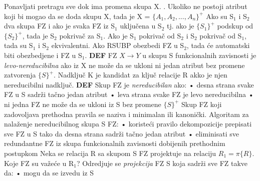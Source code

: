 \documentclass{article}
\begin{document}
Ponavljati pretragu sve dok ima promena skupa X. . Ukoliko ne postoji atribut koji bi mogao da se doda skupu X, tada
je X = $\{A_1,A_2,...,A_n\}^+$ 
\newpage
Ako su S$_1$ i S$_2$ dva skupa FZ i ako je svaka FZ iz S$_1$
uključena u S$_2$ tj. ako je $\{S_1\}^+$ podskup od $\{S_2\}^+$, tada
je S$_2$ pokrivač za S$_1$. Ako je S$_1$ pokrivač od S$_2$ i S$_2$
pokrivač od S$_1$, tada su S$_1$ i S$_2$ ekvivalentni. Ako RSUBP
obezbedi FZ u S$_2$, tada će automatski biti obezbedjene i FZ u
S$_1$.
\vspace{0.2cm} \newline
\textbf{DEF} FZ $X \rightarrow Y$ u skupu S funkcionalnih zavisnosti
je \textit{levo-nereducibilna} ako iz X ne može da se ukloni ni jedan
atribut bez promene zatvorenja $\{S\}^+$. \newline
Nadključ K je kandidat za ključ relacije R akko je njen nereducibilni
nadključ. \newline
\textbf{DEF} Skup FZ je \textit{nereducibilan} ako:
\newline \hspace*{0.4cm}• desna strana svake FZ u S sadrži tačno
jedan atribut
\newline \hspace*{0.4cm}• leva strana svake FZ je levo nereducibilna
\newline \hspace*{0.4cm}• ni jedna FZ ne može da se ukloni iz S bez
promene $\{S\}^+$
\newline Skup FZ koji zadovoljava prethodna pravila se naziva i
minimalan ili kanonički.
\vspace{0.2cm} \newline Algoritam za nalaženje nereducibilnog skupa S
FZ:
\newline \hspace*{0.4cm}• koristeći pravilo dekompozicije prepisati
sve FZ u S tako da desna strana sadrži tačno jedan atribut
\newline \hspace*{0.4cm}• eliminisati sve redundantne FZ iz skupa
funkcionalnih zavisnosti dobijenih prethodnim postupkom
\vspace{0.2cm} \newline
Neka se relacija R sa skupom S FZ projektuje na relaciju 
$R_1 = \pi \{R\}$. Koje FZ su važeće u R$_1$? Odredjuje se
\textit{projekcija} FZ S koja sadrži sve FZ takve da:
\newline \hspace*{0.4cm}• mogu da se izvedu iz S
\end{document}
